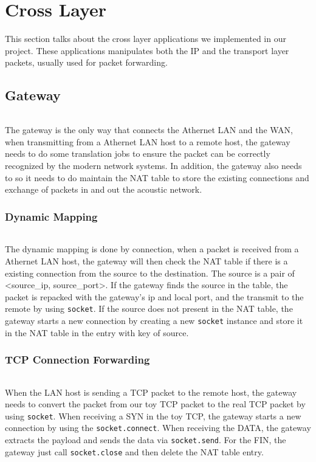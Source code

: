 \chapter{Cross Layer}\label{ch:ch7label}

This section talks about the cross layer applications we implemented in our project. These applications manipulates both the IP and the transport layer packets, usually used for packet forwarding.

\section{Gateway}

    \subparagraph{}
    The gateway is the only way that connects the Athernet LAN and the WAN, when transmitting from a Athernet LAN host to a remote host, the gateway needs to do some translation jobs to ensure the packet can be correctly recognized by the modern network systems. In addition, the gateway also needs to so it needs to do maintain the NAT table to store the existing connections and exchange of packets in and out the acoustic network.
    
    \subsection{Dynamic Mapping}
        \subparagraph{}
        The dynamic mapping is done by connection, when a packet is received from a Athernet LAN host, the gateway will then check the NAT table if there is a existing connection from the source to the destination. The source is a pair of <source\_ip, source\_port>. If the gateway finds the source in the table, the packet is repacked with the gateway's ip and local port, and the transmit to the remote by using {\tt socket}. If the source does not present in the NAT table, the gateway starts a new connection by creating a new {\tt socket} instance and store it in the NAT table in the entry with key of source.

    \subsection{TCP Connection Forwarding}
        \subparagraph{}
        When the LAN host is sending a TCP packet to the remote host, the gateway needs to convert the packet from our toy TCP packet to the real TCP packet by using {\tt socket}. When receiving a SYN in the toy TCP, the gateway starts a new connection by using the {\tt socket.connect}. When receiving the DATA, the gateway extracts the payload and sends the data via {\tt socket.send}. For the FIN, the gateway just call {\tt socket.close} and then delete the NAT table entry.

